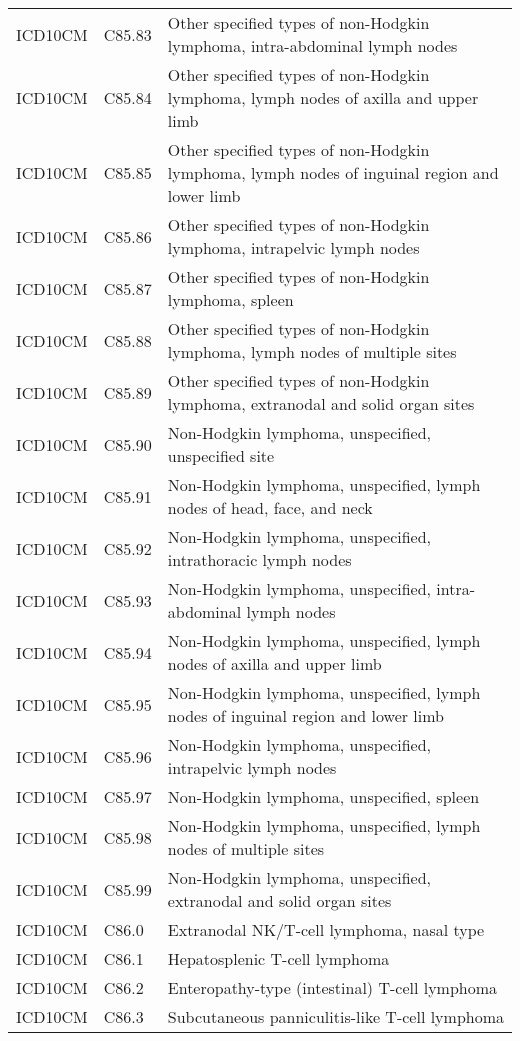 \begin{longtable}{p{}p{}p{}}
  ICD10CM & C85.83 & Other specified types of non-Hodgkin lymphoma, intra-abdominal lymph nodes \\ 
  ICD10CM & C85.84 & Other specified types of non-Hodgkin lymphoma, lymph nodes of axilla and upper limb \\ 
  ICD10CM & C85.85 & Other specified types of non-Hodgkin lymphoma, lymph nodes of inguinal region and lower limb \\ 
  ICD10CM & C85.86 & Other specified types of non-Hodgkin lymphoma, intrapelvic lymph nodes \\ 
  ICD10CM & C85.87 & Other specified types of non-Hodgkin lymphoma, spleen \\ 
  ICD10CM & C85.88 & Other specified types of non-Hodgkin lymphoma, lymph nodes of multiple sites \\ 
  ICD10CM & C85.89 & Other specified types of non-Hodgkin lymphoma, extranodal and solid organ sites \\ 
  ICD10CM & C85.90 & Non-Hodgkin lymphoma, unspecified, unspecified site \\ 
  ICD10CM & C85.91 & Non-Hodgkin lymphoma, unspecified, lymph nodes of head, face, and neck \\ 
  ICD10CM & C85.92 & Non-Hodgkin lymphoma, unspecified, intrathoracic lymph nodes \\ 
  ICD10CM & C85.93 & Non-Hodgkin lymphoma, unspecified, intra-abdominal lymph nodes \\ 
  ICD10CM & C85.94 & Non-Hodgkin lymphoma, unspecified, lymph nodes of axilla and upper limb \\ 
  ICD10CM & C85.95 & Non-Hodgkin lymphoma, unspecified, lymph nodes of inguinal region and lower limb \\ 
  ICD10CM & C85.96 & Non-Hodgkin lymphoma, unspecified, intrapelvic lymph nodes \\ 
  ICD10CM & C85.97 & Non-Hodgkin lymphoma, unspecified, spleen \\ 
  ICD10CM & C85.98 & Non-Hodgkin lymphoma, unspecified, lymph nodes of multiple sites \\ 
  ICD10CM & C85.99 & Non-Hodgkin lymphoma, unspecified, extranodal and solid organ sites \\ 
  ICD10CM & C86.0 & Extranodal NK/T-cell lymphoma, nasal type \\ 
  ICD10CM & C86.1 & Hepatosplenic T-cell lymphoma \\ 
  ICD10CM & C86.2 & Enteropathy-type (intestinal) T-cell lymphoma \\ 
  ICD10CM & C86.3 & Subcutaneous panniculitis-like T-cell lymphoma \\ 

\end{longtable}
